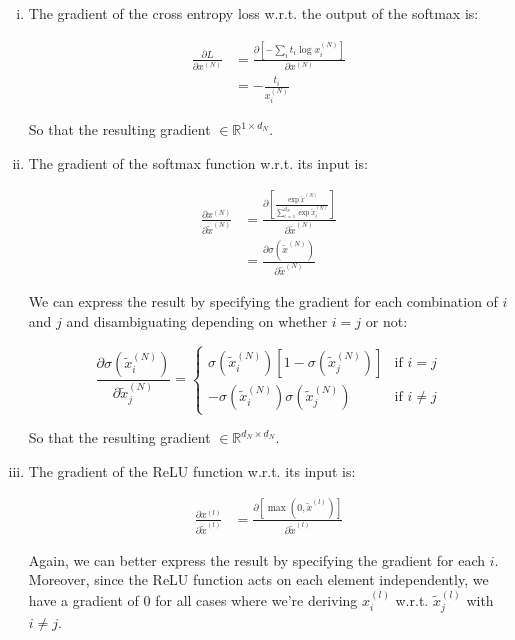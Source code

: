 \documentclass{article}
\begin{document}
\begin{enumerate}[i.]
  \item The gradient of the cross entropy loss w.r.t. the output of the softmax is:

  \begin{align*}
    \frac{\partial L}{\partial x^{(N)}} &= \frac{\partial \left[ - \sum_i t_i \log{x_i^{(N)}} \right]}{\partial x^{(N)}} \\
    &= - \frac{t_i}{x_i^{(N)}}
  \end{align*}

  So that the resulting gradient $\in \mathbb{R}^{1 \times d_N}$.

  \item The gradient of the softmax function w.r.t. its input is:

  \begin{align*}
    \frac{\partial x^{(N)}}{\partial \tilde{x}^{(N)}} &= \frac{\partial \left[ \frac{\exp{\tilde{x}^{(N)}}}{\sum_{i=1}^{d_N}{\exp{\tilde{x}_i^{(N)}}}} \right]}{\partial \tilde{x}^{(N)}} \\
    &= \frac{\partial \sigma(\tilde{x}^{(N)})}{\partial \tilde{x}^{(N)}}
  \end{align*}

  We can express the result by specifying the gradient for each combination of $i$ and $j$ and disambiguating depending on whether $i = j$ or not:

  \begin{equation*}
    \frac{\partial \sigma(\tilde{x}_i^{(N)})}{\partial \tilde{x}_j^{(N)}} =
    \begin{cases}
      \sigma(\tilde{x}_i^{(N)})\left[ 1 - \sigma(\tilde{x}_j^{(N)}) \right] & \text{if } i = j \\
      - \sigma(\tilde{x}_i^{(N)}) \sigma(\tilde{x}_j^{(N)}) & \text{if } i \neq j
    \end{cases}
  \end{equation*}

  So that the resulting gradient $\in \mathbb{R}^{d_N \times d_N}$.

  \item The gradient of the ReLU function w.r.t. its input is:

  \begin{align*}
    \frac{\partial x^{(l)}}{\partial \tilde{x}^{(l)}} &= \frac{\partial \left[ \max(0, \tilde{x}^{(l)}) \right]}{\partial \tilde{x}^{(l)}}
  \end{align*}

  Again, we can better express the result by specifying the gradient for each $i$. Moreover, since the ReLU function acts on each element independently, we have a gradient of 0 for all cases where we're deriving $x_i^{(l)}$ w.r.t. $\tilde{x}_j^{(l)}$ with $i \neq j$.


\end{enumerate}
\end{document}
